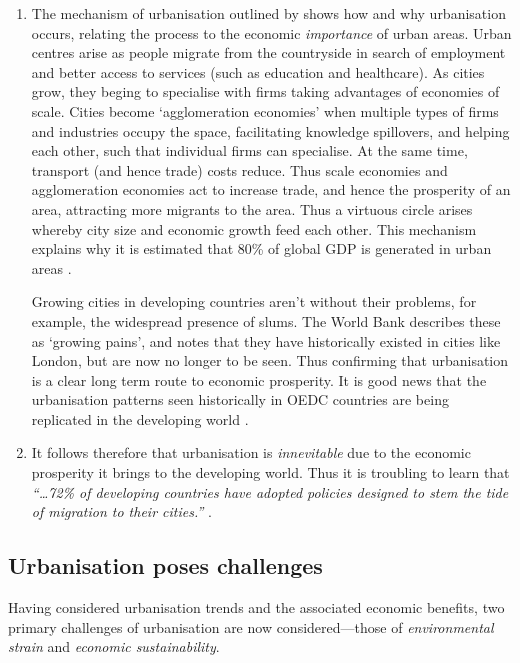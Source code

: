 \begin{enumerate}
	\item The mechanism of urbanisation outlined by \citet{WorldBank2008a} shows how and why urbanisation occurs, relating the process to the economic \emph{importance} of urban areas. Urban centres arise as people migrate from the countryside in search of employment and better access to services (such as education and healthcare). As cities grow, they beging to specialise with firms taking advantages of economies of scale. Cities become `agglomeration economies' when multiple types of firms and industries occupy the space, facilitating knowledge spillovers, and helping each other, such that individual firms can specialise. At the same time, transport (and hence trade) costs reduce. Thus scale economies and agglomeration economies act to increase trade, and hence the prosperity of an area, attracting more migrants to the area. Thus a virtuous circle arises whereby city size and economic growth feed each other. This mechanism explains why it is estimated that 80\% of global GDP is generated in urban areas \citep{AREAS2012}.

Growing cities in developing countries aren't without their problems, for example, the widespread presence of slums. The World Bank describes these as `growing pains', and notes that they have historically existed in cities like London, but are now no longer to be seen. Thus confirming that urbanisation is a clear long term route to economic prosperity. It is good news that the urbanisation patterns seen historically in OEDC countries are being replicated in the developing world \citep{WorldBank2008a}. 

	\item It follows therefore that urbanisation is \emph{innevitable} due to the economic prosperity it brings to the developing world. Thus it is troubling to learn that \emph{``\ldots 72\% of developing countries have adopted policies designed to stem the tide of migration to their cities.''} \citep{Donald2012}.
\end{enumerate}

\subsection{Urbanisation poses challenges}
Having considered urbanisation trends and the associated economic benefits, two primary challenges of urbanisation are now considered---those of \emph{environmental strain} and \emph{economic sustainability}.

